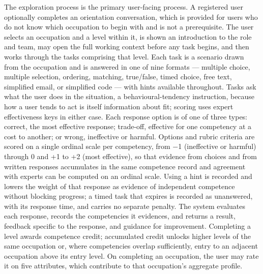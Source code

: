 The exploration process is the primary user-facing process. A registered user optionally completes an orientation conversation, which is provided for users who do not know which occupation to begin with and is not a prerequisite. The user selects an occupation and a level within it, is shown an introduction to the role and team, may open the full working context before any task begins, and then works through the tasks comprising that level. Each task is a scenario drawn from the occupation and is answered in one of nine formats --- multiple choice, multiple selection, ordering, matching, true/false, timed choice, free text, simplified email, or simplified code --- with hints available throughout. Tasks ask what the user does in the situation, a behavioural-tendency instruction\cite{r28}, because how a user tends to act is itself information about fit; scoring uses expert effectiveness keys in either case. Each response option is of one of three types: correct, the most effective response; trade-off, effective for one competency at a cost to another; or wrong, ineffective or harmful. Options and rubric criteria are scored on a single ordinal scale per competency, from $-$1 (ineffective or harmful) through 0 and +1 to +2 (most effective), so that evidence from choices and from written responses accumulates in the same competence record and agreement with experts can be computed on an ordinal scale. Using a hint is recorded and lowers the weight of that response as evidence of independent competence without blocking progress; a timed task that expires is recorded as unanswered, with its response time, and carries no separate penalty. The system evaluates each response, records the competencies it evidences, and returns a result, feedback specific to the response, and guidance for improvement. Completing a level awards competence credit; accumulated credit unlocks higher levels of the same occupation or, where competencies overlap sufficiently, entry to an adjacent occupation above its entry level. On completing an occupation, the user may rate it on five attributes, which contribute to that occupation's aggregate profile.

